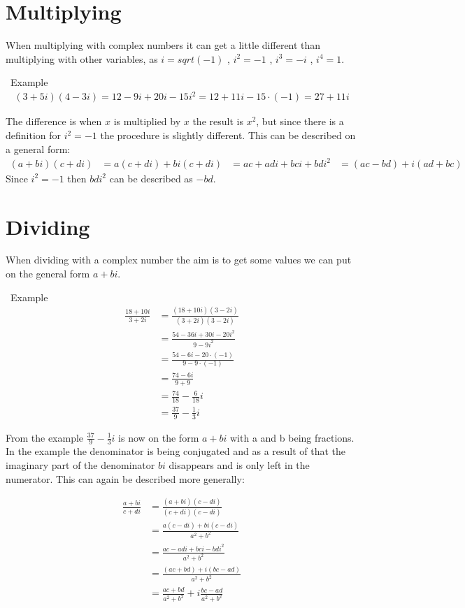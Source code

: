 \section{Multiplying}
When multiplying with complex numbers it can get a little different than multiplying with other variables, as $i=sqrt(-1)$ , $i^2=-1$ , $i^3=-i$ , $i^4=1$. \\
\begin{myexample}
\
Example
\begin{align*}
(3+5i)(4-3i) = 12 - 9i + 20i - 15i^2 = 12 + 11i - 15 \cdot (-1) = 27 + 11i
\end{align*}
\end{myexample}
The difference is when $x$ is multiplied by $x$ the result is $x^2$, but since there is a definition for $i^2=-1$ the procedure is slightly different. 
This can be described on a general form:
\begin{align*}
(a + bi)(c + di) &= a(c + di) + bi(c + di)
&= ac + adi + bci + bdi^2
&= (ac - bd) + i(ad + bc)
\end{align*}
Since $i^2 = -1$ then $bdi^2$ can be described as $-bd$.



\section{Dividing}
When dividing with a complex number the aim is to get some values we can put on the general form $a + bi$. 
\begin{myexample}
\
Example
\begin{align*}
\frac{18 + 10i}{3 + 2i} &= \frac{(18 + 10i)(3 - 2i)}{(3+2i)(3-2i)} \\[1em]
&= \frac{54 - 36i + 30i - 20i^2}{9 - 9i^2} \\[1em]
&= \frac{54 - 6i - 20 \cdot (-1)}{9 - 9 \cdot (-1)} \\[1em]
&= \frac{74 - 6i}{9 + 9} \\[1em]
&= \frac{74}{18} - \frac{6}{18}i \\[1em]
&= \frac{37}{9} - \frac{1}{3}i
\end{align*}
\end{myexample}
From the example $\frac{37}{9} - \frac{1}{3}i$ is now on the form $a+bi$ with a and b being fractions. In the example the denominator is being conjugated and as a result of that the imaginary part of the denominator $bi$ disappears and is only left in the numerator. 
This can again be described more generally:
\begin{center}
\begin{align*}
\frac{a + bi}{c + di} 										
&= \frac{(a+bi)(c-di)}{(c+di)(c-di)} 						\\[1em]
&= \frac{a(c-di)+bi(c-di)}{a^2+b^2} 							\\[1em]
&= \frac{ac-adi+bci-bdi^2}{a^2+b^2}							\\[1em]
&= \frac{(ac+bd)+i(bc-ad)}{a^2+b^2}							\\[1em]
&= \frac{ac+bd}{a^2+b^2}+i \frac{bc-ad}{a^2+b^2}				
\end{align*}
\end{center}


